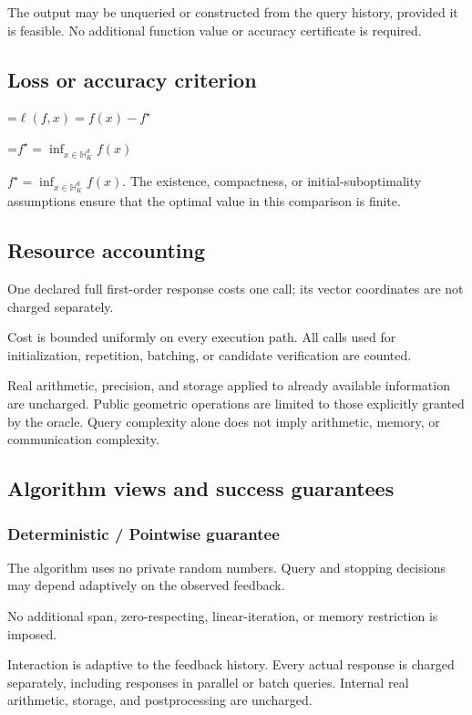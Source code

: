 \documentclass[10pt,a4paper]{article}
\newcommand{\AtlasMath}[1]{\par\begingroup\centering\setbox0=\hbox{$\displaystyle #1$}\ifdim\wd0>1.4\linewidth\typeout{ATLAS WIDE FORMULA: \the\wd0}\fi\ifdim\wd0>\linewidth\resizebox{\linewidth}{!}{\box0}\else\box0\fi\par\endgroup}
\newcommand{\AtlasInlineMath}[1]{\begingroup\setbox0=\hbox{$#1$}\ifdim\wd0>.4\linewidth\endgroup\AtlasMath{#1}\else\endgroup$#1$\fi}
\begin{document}
The output may be unqueried or constructed from the query history, provided it is feasible. No additional function value or accuracy certificate is required.

\subsection{Loss or accuracy criterion}

\AtlasMath{\ell(f,x)=f(x)-f^\star}


\AtlasInlineMath{f^\star=\inf_{x\in \mathbb{H}_K^d}f(x)}. The existence, compactness, or initial-suboptimality assumptions ensure that the optimal value in this comparison is finite.

\subsection{Resource accounting}
One declared full first-order response costs one call; its vector coordinates are not charged separately.

Cost is bounded uniformly on every execution path. All calls used for initialization, repetition, batching, or candidate verification are counted.

Real arithmetic, precision, and storage applied to already available information are uncharged. Public geometric operations are limited to those explicitly granted by the oracle. Query complexity alone does not imply arithmetic, memory, or communication complexity.

\subsection{Algorithm views and success guarantees}
\subsubsection{Deterministic / Pointwise guarantee}
The algorithm uses no private random numbers. Query and stopping decisions may depend adaptively on the observed feedback.

No additional span, zero-respecting, linear-iteration, or memory restriction is imposed.

Interaction is adaptive to the feedback history. Every actual response is charged separately, including responses in parallel or batch queries. Internal real arithmetic, storage, and postprocessing are uncharged.
\end{document}

